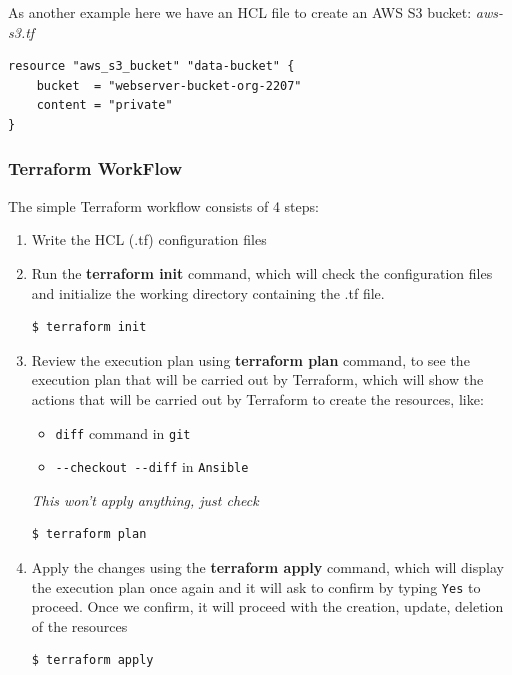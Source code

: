 \documentclass{article}
\newenvironment{codetemplate}[1][]{%
  \mybasecolorbox[#1]
  \itshape
}{%
  \endmybasecolorbox
}
\begin{document}
As another example here we have an HCL file to create an AWS S3 bucket:
\begin{codetemplate}{aws-s3.tf}
\begin{verbatim}
resource "aws_s3_bucket" "data-bucket" {
    bucket  = "webserver-bucket-org-2207"
    content = "private"
}
\end{verbatim}
\end{codetemplate}

\subsubsection{Terraform WorkFlow}
The simple Terraform workflow consists of 4 steps:

\begin{enumerate}
    \item Write the HCL (.tf) configuration files
    \item Run the \textbf{terraform init} command, which will check the configuration files and initialize the working directory containing the .tf file.
\begin{codetemplate}{}
\begin{verbatim}
$ terraform init
\end{verbatim}
\end{codetemplate}
    \item Review the execution plan using \textbf{terraform plan} command, to see the execution plan that will be carried out by Terraform, which will show the actions that will be carried out by Terraform to create the resources, like:
\begin{itemize}
    \item \verb+diff+ command in \verb+git+
    \item \verb+--checkout --diff+ in \verb+Ansible+
\end{itemize} 
\begin{codetemplate}{This won't apply anything, just check}
\begin{verbatim}
$ terraform plan
\end{verbatim}
\end{codetemplate}
    \item Apply the changes using the \textbf{terraform apply} command, which will display the execution plan once again and it will ask to confirm by typing \verb+Yes+ to proceed. Once we confirm, it will proceed with the creation, update, deletion of the resources
\begin{codetemplate}{}
\begin{verbatim}
$ terraform apply
\end{verbatim}
\end{codetemplate}
\end{enumerate}
\end{document}
